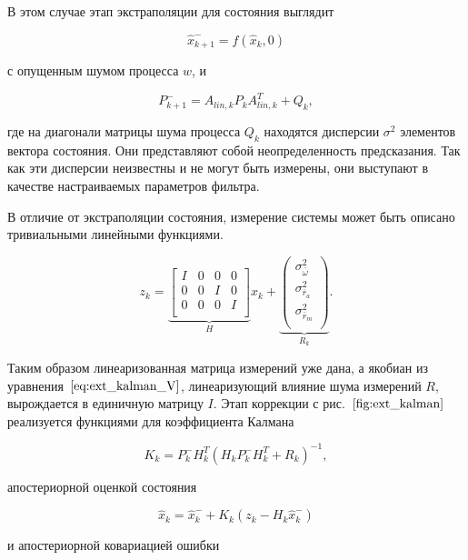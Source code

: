 \documentclass[12pt,a4paper]{article}
\newcounter{subsubsubsection}[subsubsection]
\begin{document}
В этом случае этап экстраполяции для состояния выглядит

$$ \hat x_{k+1}^- = f(\hat x_k,0) $$

с опущенным шумом процесса $w$, и

$$ P_{k+1}^- = A_{lin,k}P_k A_{lin,k}^T + Q_k,$$

где на диагонали матрицы шума процесса $Q_k$ находятся дисперсии $\sigma^2$ элементов вектора состояния. Они представляют собой неопределенность предсказания. Так как эти дисперсии неизвестны и не могут быть измерены, они выступают в качестве настраиваемых параметров фильтра.



В отличие от экстраполяции состояния, измерение системы может быть описано тривиальными линейными функциями.

\begin{equation}
	\label{eq:ext_kalman_meas_impl}
	z_k = \underbrace{
		\begin{bmatrix}
			I & 0 & 0 & 0 \\
			0 & 0 & I & 0 \\
			0 & 0 & 0 & I \\
		\end{bmatrix}
	}_H
	x_k + \underbrace{
		\begin{pmatrix}
			\sigma_{\bar\omega}^2 \\
			\sigma_{\bar r_a}^2 \\
			\sigma_{\bar r_m}^2 \\
		\end{pmatrix}
	}_{R_k}.
\end{equation}

Таким образом линеаризованная матрица измерений уже дана, а якобиан из уравнения~$\eqref{eq:ext_kalman_V}$, линеаризующий влияние шума измерений $R$, вырождается в единичную матрицу $I$. Этап коррекции с рис.~$\ref{fig:ext_kalman}$ реализуется функциями для коэффициента Калмана

\begin{equation}
\label{eq:ext_kalman_K}
	K_k = P_k^- H_k^T \left(H_k P_k^- H_k^T + R_k\right)^{-1},
\end{equation}

апостериорной оценкой состояния

\begin{equation}
\label{eq:ext_kalman_x_apost}
	\hat x_k = \hat x_k^- + K_k(z_k - H_k \hat x_k^-)
\end{equation}

и апостериорной ковариацией ошибки
\end{document}
